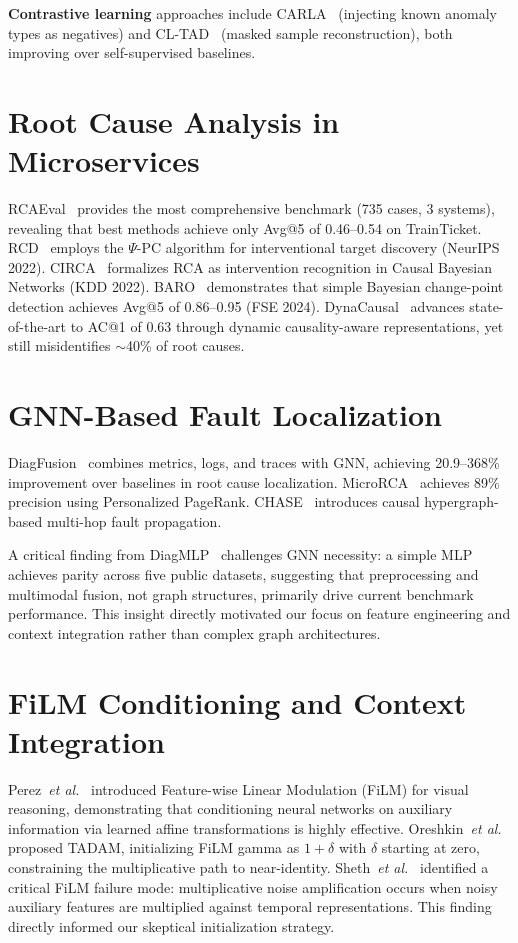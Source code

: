\documentclass[12pt,a4paper]{report}
\begin{document}
\textbf{Contrastive learning} approaches include CARLA~\cite{darban2024carla} (injecting known anomaly types as negatives) and CL-TAD~\cite{cltad2023} (masked sample reconstruction), both improving over self-supervised baselines.

\section{Root Cause Analysis in Microservices}

RCAEval~\cite{pham2024rcaeval} provides the most comprehensive benchmark (735 cases, 3 systems), revealing that best methods achieve only Avg@5 of 0.46--0.54 on TrainTicket. RCD~\cite{ikram2022rcd} employs the $\Psi$-PC algorithm for interventional target discovery (NeurIPS 2022). CIRCA~\cite{li2022circa} formalizes RCA as intervention recognition in Causal Bayesian Networks (KDD 2022). BARO~\cite{chen2024baro} demonstrates that simple Bayesian change-point detection achieves Avg@5 of 0.86--0.95 (FSE 2024). DynaCausal~\cite{dynacausal2025} advances state-of-the-art to AC@1 of 0.63 through dynamic causality-aware representations, yet still misidentifies $\sim$40\% of root causes.

\section{GNN-Based Fault Localization}

DiagFusion~\cite{zhang2023diagfusion} combines metrics, logs, and traces with GNN, achieving 20.9--368\% improvement over baselines in root cause localization. MicroRCA~\cite{wu2020microrcarootcause} achieves 89\% precision using Personalized PageRank. CHASE~\cite{chase2024} introduces causal hypergraph-based multi-hop fault propagation.

A critical finding from DiagMLP~\cite{diagmlp2025} challenges GNN necessity: a simple MLP achieves parity across five public datasets, suggesting that preprocessing and multimodal fusion, not graph structures, primarily drive current benchmark performance. This insight directly motivated our focus on feature engineering and context integration rather than complex graph architectures.

\section{FiLM Conditioning and Context Integration}

Perez~\textit{et al.}~\cite{perez2018film} introduced Feature-wise Linear Modulation (FiLM) for visual reasoning, demonstrating that conditioning neural networks on auxiliary information via learned affine transformations is highly effective. Oreshkin~\textit{et al.}~\cite{oreshkin2018tadam} proposed TADAM, initializing FiLM gamma as $1 + \delta$ with $\delta$ starting at zero, constraining the multiplicative path to near-identity. Sheth~\textit{et al.}~\cite{sheth2022auxiliary} identified a critical FiLM failure mode: multiplicative noise amplification occurs when noisy auxiliary features are multiplied against temporal representations. This finding directly informed our skeptical initialization strategy.
\end{document}
